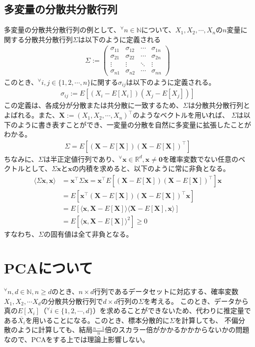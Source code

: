 \documentclass[10pt]{ujarticle}
\begin{document}
\subsection{多変量の分散共分散行列}
多変量の分散共分散行列の例として、$^\forall n\in\mathbb{N}$について、$X_1,X_2,\cdots,X_n$の$n$変量に関する分散共分散行列$\Sigma$は以下のように定義される
$$
\begin{aligned}
  \Sigma:=\begin{pmatrix}\sigma_{11}&\sigma_{12}&\cdots&\sigma_{1n}\\\sigma_{21}&\sigma_{22}&\cdots&\sigma_{2n}\\\vdots&\vdots&\ddots&\vdots\\\sigma_{n1}&\sigma_{n2}&\cdots&\sigma_{nn}\end{pmatrix}
\end{aligned}
$$
このとき、$^\forall i,j\in\{1,2,\cdots,n\}$に関する$\sigma_{ij}$は以下のように定義される。
$$
\begin{aligned}
  \sigma_{ij}:=E[(X_i-E[X_i])(X_j-E[X_j])]
\end{aligned}
$$
この定義は、各成分が分散または共分散に一致するため、$\Sigma$は分散共分散行列とよばれる。また、$\mathbf{X}:=(X_1,X_2,\cdots,X_n)^\top$のようなベクトルを用いれば、
$\Sigma$は以下のように書き表すことができ、一変量の分散を自然に多変量に拡張したことがわかる。
$$
\begin{aligned}
  \Sigma=E[(\mathbf{X}-E[\mathbf{X}])(\mathbf{X}-E[\mathbf{X}])^\top]
\end{aligned}
$$
ちなみに、$\Sigma$は半正定値行列であり、$^\forall \mathbf{x}\in\mathbb{R}^d,\mathbf{x}\neq\mathbf{0}$を確率変数でない任意のベクトルとして、$\Sigma\mathbf{x}$と$\mathbf{x}$の内積を求めると、以下のように常に非負となる。
$$
\begin{aligned}
  \langle\Sigma\mathbf{x},\mathbf{x}\rangle&=\mathbf{x}^\top\Sigma\mathbf{x}=\mathbf{x}^\top E[(\mathbf{X}-E[\mathbf{X}])(\mathbf{X}-E[\mathbf{X}])^\top]\mathbf{x}\\
  &=E[\mathbf{x}^\top (\mathbf{X}-E[\mathbf{X}])(\mathbf{X}-E[\mathbf{X}])^\top \mathbf{x}]\\
  &=E[\langle\mathbf{x},\mathbf{X}-E[\mathbf{X}]\rangle\langle\mathbf{X}-E[\mathbf{X}],\mathbf{x}\rangle]\\
  &=E[\langle\mathbf{x},\mathbf{X}-E[\mathbf{X}]\rangle^2]\geq 0
\end{aligned}
$$
すなわち、$\Sigma$の固有値は全て非負となる。

\section{PCAについて}
$^\forall n,d\in\mathbb{N},n\geq d$のとき、$n\times d$行列であるデータセットに対応する、確率変数$X_1,X_2,\cdots X_d$の分散共分散行列で$d\times d$行列の$\Sigma$を考える。
このとき、データから真の$E[X_i]$（$^\forall i\in\{1,2,\cdots, d\}$）を求めることができないため、代わりに推定量である$\overline{X_i}$を用いることになる。このとき、標本分散的に$\Sigma$を計算しても、
不偏分散のように計算しても、結局$\frac{n-1}{n}$倍のスカラー倍がかかるかかからないかの問題なので、PCAをする上では理論上影響しない。
\end{document}
